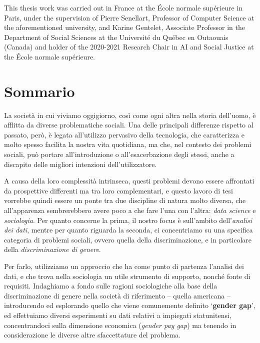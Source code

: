 This thesis work was carried out in France at the \'Ecole normale sup\'erieure in Paris, under the supervision of Pierre Senellart, Professor of Computer Science at the aforementioned university, and Karine Gentelet, Associate Professor in the Department of Social Sciences at the Universit\'e du Qu\'ebec en Outaouais (Canada) and holder of the 2020-2021 Research Chair in AI and Social Justice at the \'Ecole normale sup\'erieure.


\newpage
\chapter*{Sommario}


La societ\`a in cui viviamo oggigiorno, cos\`i come ogni altra nella storia dell'uomo, \`e afflitta da diverse problematiche sociali. Una delle principali differenze rispetto al passato, per\`o, \`e legata all'utilizzo pervasivo della tecnologia, che caratterizza e molto spesso facilita la nostra vita quotidiana, ma che, nel contesto dei problemi sociali, pu\`o portare all'introduzione o all'esacerbazione degli stessi, anche a discapito delle migliori intenzioni dell'utilizzatore.

A causa della loro complessit\`a intrinseca, questi problemi devono essere affrontati da prospettive differenti ma tra loro complementari, e questo lavoro di tesi vorrebbe quindi essere un ponte tra due discipline di natura molto diversa, che all'apparenza sembrerebbero avere poco a che fare l'una con l'altra: \textit{data science} e \textit{sociologia}. Per quanto concerne la prima, il nostro focus \`e sull'ambito dell'\textit{analisi dei dati}, mentre per quanto riguarda la seconda, ci concentriamo su una specifica categoria di problemi sociali, ovvero quella della discriminazione, e in particolare della \textit{discriminazione di genere}.

Per farlo, utilizziamo un approccio che ha come punto di partenza l'analisi dei dati, e che trova nella sociologia un utile strumento di supporto, nonch\'e fonte di requisiti. Indaghiamo a fondo sulle ragioni sociologiche alla base della discriminazione di genere nella societ\`a di riferimento -- quella americana -- introducendo ed esplorando quello che viene comunemente definito `\textbf{gender gap}', ed effettuiamo diversi esperimenti su dati relativi a impiegati statunitensi, concentrandoci sulla dimensione economica (\textit{gender pay gap}) ma tenendo in considerazione le diverse altre sfaccettature del problema.

